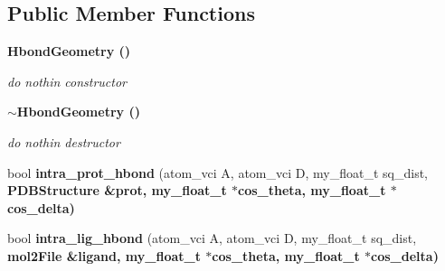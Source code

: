 \subsection*{Public Member Functions}
\begin{CompactItemize}
\item 
\bf{Hbond\-Geometry} ()\label{classSimSite3D_1_1HbondGeometry_f6af480ef52e15eb1ebd8adde6d525d7}

\begin{CompactList}\small\item\em do nothin constructor \item\end{CompactList}\item 
\bf{$\sim$Hbond\-Geometry} ()\label{classSimSite3D_1_1HbondGeometry_9c9e35e681954f55d64548c7f8bfd086}

\begin{CompactList}\small\item\em do nothin destructor \item\end{CompactList}\item 
bool \textbf{intra\_\-prot\_\-hbond} (atom\_\-vci A, atom\_\-vci D, my\_\-float\_\-t sq\_\-dist, \bf{PDBStructure} \&prot, my\_\-float\_\-t $\ast$cos\_\-theta, my\_\-float\_\-t $\ast$cos\_\-delta)\label{classSimSite3D_1_1HbondGeometry_bce57004079a80856d9c5078b3b487d7}

\item 
bool \textbf{intra\_\-lig\_\-hbond} (atom\_\-vci A, atom\_\-vci D, my\_\-float\_\-t sq\_\-dist, \bf{mol2File} \&ligand, my\_\-float\_\-t $\ast$cos\_\-theta, my\_\-float\_\-t $\ast$cos\_\-delta)\label{classSimSite3D_1_1HbondGeometry_ba541a4f7b2f58f99ef30fb933e5dd64}


\end{CompactItemize}
